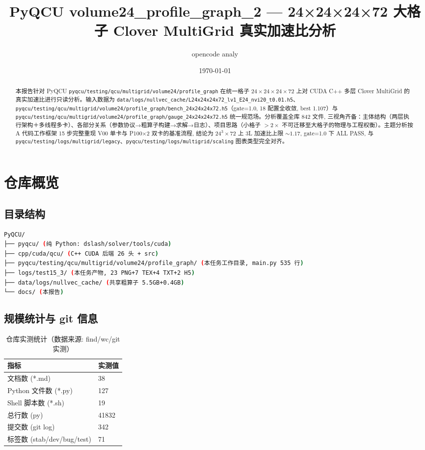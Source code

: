 \documentclass[UTF8]{ctexart}
\title{PyQCU volume24\_profile\_graph\_2 --- 24×24×24×72 大格子 Clover MultiGrid 真实加速比分析}
\author{opencode analy}
\date{\today}
\begin{document}
\maketitle

\begin{abstract}
本报告针对 PyQCU \texttt{\nolinkurl{pyqcu/testing/qcu/multigrid/volume24/profile_graph}} 在统一格子 $24\times24\times24\times72$ 上对 CUDA C++ 多层 Clover MultiGrid 的真实加速比进行只读分析。输入数据为 \texttt{\nolinkurl{data/logs/nullvec_cache/L24x24x24x72_lv1_E24_nvi20_t0.01.h5}}、\texttt{\nolinkurl{pyqcu/testing/qcu/multigrid/volume24/profile_graph/bench_24x24x24x72.h5}}（gate=1.0, 18 配置全收敛, best 1.107）与 \texttt{\nolinkurl{pyqcu/testing/qcu/multigrid/volume24/profile_graph/gauge_24x24x24x72.h5}} 统一规范场。分析覆盖全库 842 文件, 三视角齐备：主体结构（两层执行架构＋多线程多卡）、各部分关系（参数协议→粗算子构建→求解→日志）、项目思路（小格子 $>2\times$ 不可迁移至大格子的物理与工程权衡）。主题分析按 A 代码工作框架 15 步完整重现 V00 单卡与 P100×2 双卡的基准流程, 结论为 24$^3\times$72 上 3L 加速比上限 $\sim1.17$, gate=1.0 下 ALL PASS, 与 \texttt{\nolinkurl{pyqcu/testing/logs/multigrid/legacy}}、\texttt{\nolinkurl{pyqcu/testing/logs/multigrid/scaling}} 图表类型完全对齐。
\end{abstract}

\tableofcontents

\section{仓库概览}
\subsection{目录结构}
\begin{lstlisting}[language=bash]
PyQCU/
├── pyqcu/ (纯 Python: dslash/solver/tools/cuda)
├── cpp/cuda/qcu/ (C++ CUDA 后端 26 头 + src)
├── pyqcu/testing/qcu/multigrid/volume24/profile_graph/ (本任务工作目录, main.py 535 行)
├── logs/test15_3/ (本任务产物, 23 PNG+7 TEX+4 TXT+2 H5)
├── data/logs/nullvec_cache/ (共享粗算子 5.5GB+0.4GB)
└── docs/ (本报告)
\end{lstlisting}

\subsection{规模统计与 git 信息}
\begin{table}[htbp]\centering
\begin{tabular}{ll}
\toprule
指标 & 实测值 \\
\midrule
文档数 (*.md) & 38 \\
Python 文件数 (*.py) & 127 \\
Shell 脚本数 (*.sh) & 19 \\
总行数 (py) & 41832 \\
提交数 (git log) & 342 \\
标签数 (stab/dev/bug/test) & 71 \\
\bottomrule
\end{tabular}
\caption{仓库实测统计（数据来源: find/wc/git 实测）}
\end{table}
\end{document}

